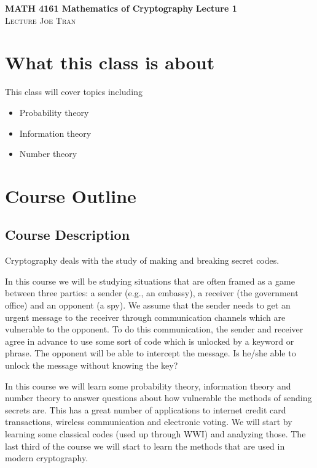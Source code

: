 \documentclass[11pt]{amsart}
\date{January 9, 2024}
\theoremstyle{definition}\newtheorem{definition}{Definition}
\theoremstyle{definition}\newtheorem{example}{Example}
\begin{document}
\noindent \textbf{MATH 4161 Mathematics of Cryptography} \hfill \textbf{Lecture 1} \\
\noindent \textsc{Lecture} \hfill \textsc{Joe Tran}

\tableofcontents

\section{What this class is about}

This class will cover topics including
\begin{itemize}
    \item Probability theory
    \item Information theory
    \item Number theory
\end{itemize}

\section{Course Outline}

\subsection{Course Description}

Cryptography deals with the study of making and breaking secret codes.

In this course we will be studying situations that are often framed as a game between three parties: a sender (e.g., an embassy), a receiver (the government office) and an opponent (a spy). We assume that the sender needs to get an urgent message to the receiver through communication channels which are vulnerable to the opponent. To do this communication, the sender and receiver agree in advance to use some sort of code which is unlocked by a keyword or phrase. The opponent will be able to intercept the message. Is he/she able to unlock the message without knowing the key?

In this course we will learn some probability theory, information theory and number theory to answer questions about how vulnerable the methods of sending secrets are. This has a great number of applications to internet credit card transactions, wireless communication and electronic voting. We will start by learning some classical codes (used up through WWI) and analyzing those. The last third of the course we will start to learn the methods that are used in modern cryptography.
\end{document}
